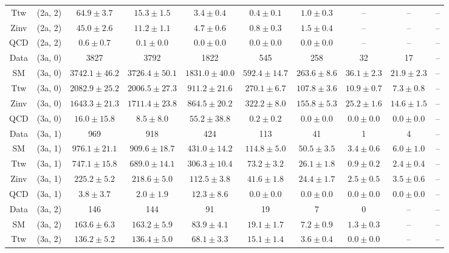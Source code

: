 \begin{table}[h!]
{\begin{tabular}{cccccccccc}
	Ttw & (2a, 2) & $64.9\pm 3.7$ & $15.3\pm 1.5$ & $3.4\pm 0.4$ & $0.4\pm 0.1$ & $1.0\pm 0.3$ & -- & -- & -- \\[0.5ex] 
	Zinv & (2a, 2) & $45.0\pm 2.6$ & $11.2\pm 1.1$ & $4.7\pm 0.6$ & $0.8\pm 0.3$ & $1.5\pm 0.4$ & -- & -- & -- \\[0.5ex] 
	QCD & (2a, 2) & $0.6\pm 0.7$ & $0.1\pm 0.0$ & $0.0\pm 0.0$ & $0.0\pm 0.0$ & $0.0\pm 0.0$ & -- & -- & -- \\[0.5ex] 
	Data & (3a, 0) & 3827 & 3792 & 1822 & 545 & 258 & 32 & 17 & -- \\[0.5ex] 
	SM & (3a, 0) & $3742.1\pm 46.2$ & $3726.4\pm 50.1$ & $1831.0\pm 40.0$ & $592.4\pm 14.7$ & $263.6\pm 8.6$ & $36.1\pm 2.3$ & $21.9\pm 2.3$ & -- \\[0.5ex] 
	Ttw & (3a, 0) & $2082.9\pm 25.2$ & $2006.5\pm 27.3$ & $911.2\pm 21.6$ & $270.1\pm 6.7$ & $107.8\pm 3.6$ & $10.9\pm 0.7$ & $7.3\pm 0.8$ & -- \\[0.5ex] 
	Zinv & (3a, 0) & $1643.3\pm 21.3$ & $1711.4\pm 23.8$ & $864.5\pm 20.2$ & $322.2\pm 8.0$ & $155.8\pm 5.3$ & $25.2\pm 1.6$ & $14.6\pm 1.5$ & -- \\[0.5ex] 
	QCD & (3a, 0) & $16.0\pm 15.8$ & $8.5\pm 8.0$ & $55.2\pm 38.8$ & $0.2\pm 0.2$ & $0.0\pm 0.0$ & $0.0\pm 0.0$ & $0.0\pm 0.0$ & -- \\[0.5ex] 
	Data & (3a, 1) & 969 & 918 & 424 & 113 & 41 & 1 & 4 & -- \\[0.5ex] 
	SM & (3a, 1) & $976.1\pm 21.1$ & $909.6\pm 18.7$ & $431.0\pm 14.2$ & $114.8\pm 5.0$ & $50.5\pm 3.5$ & $3.4\pm 0.6$ & $6.0\pm 1.0$ & -- \\[0.5ex] 
	Ttw & (3a, 1) & $747.1\pm 15.8$ & $689.0\pm 14.1$ & $306.3\pm 10.4$ & $73.2\pm 3.2$ & $26.1\pm 1.8$ & $0.9\pm 0.2$ & $2.4\pm 0.4$ & -- \\[0.5ex] 
	Zinv & (3a, 1) & $225.2\pm 5.2$ & $218.6\pm 5.0$ & $112.5\pm 3.8$ & $41.6\pm 1.8$ & $24.4\pm 1.7$ & $2.5\pm 0.5$ & $3.5\pm 0.6$ & -- \\[0.5ex] 
	QCD & (3a, 1) & $3.8\pm 3.7$ & $2.0\pm 1.9$ & $12.3\pm 8.6$ & $0.0\pm 0.0$ & $0.0\pm 0.0$ & $0.0\pm 0.0$ & $0.0\pm 0.0$ & -- \\[0.5ex] 
	Data & (3a, 2) & 146 & 144 & 91 & 19 & 7 & 0 & -- & -- \\[0.5ex] 
	SM & (3a, 2) & $163.6\pm 6.3$ & $163.2\pm 5.9$ & $83.9\pm 4.1$ & $19.1\pm 1.7$ & $7.2\pm 0.9$ & $1.3\pm 0.3$ & -- & -- \\[0.5ex] 
	Ttw & (3a, 2) & $136.2\pm 5.2$ & $136.4\pm 5.0$ & $68.1\pm 3.3$ & $15.1\pm 1.4$ & $3.6\pm 0.4$ & $0.0\pm 0.0$ & -- & -- \\[0.5ex] 

\end{tabular}}
\end{table}
